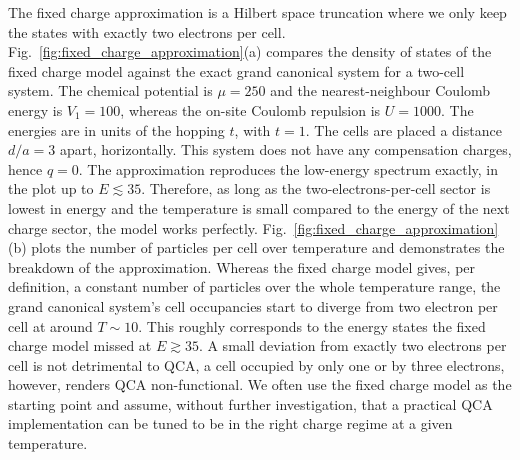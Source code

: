 %
The fixed charge approximation is a Hilbert space truncation where we only keep
the states with exactly two electrons per cell.
Fig.~\ref{fig:fixed_charge_approximation}(a) compares the density of states of
the fixed charge model against the exact grand canonical system for a two-cell
system. The chemical potential is $\mu = 250$ and the nearest-neighbour Coulomb
energy is $V_1 = 100$, whereas the on-site Coulomb repulsion is $U = 1000$. The
energies are in units of the hopping $t$, with $t = 1$. The cells are placed a
distance $d/a = 3$ apart, horizontally. This system does not have any
compensation charges, hence $q = 0$. The approximation reproduces the low-energy
spectrum exactly, in the plot up to $E \lesssim 35$. Therefore, as long as the
two-electrons-per-cell sector is lowest in energy and the temperature is small
compared to the energy of the next charge sector, the model works perfectly.
Fig.~\ref{fig:fixed_charge_approximation}(b) plots the number of particles per
cell over temperature and demonstrates the breakdown of the approximation.
Whereas the fixed charge model gives, per definition, a constant number of
particles over the whole temperature range, the grand canonical system's cell
occupancies start to diverge from two electron per cell at around $T \sim 10$.
This roughly corresponds to the energy states the fixed charge model missed at
$E \gtrsim 35$. A small deviation from exactly two electrons per cell is not
detrimental to QCA, a cell occupied by only one or by three electrons, however,
renders QCA non-functional. We often use the fixed charge model as the starting
point and assume, without further investigation, that a practical QCA
implementation can be tuned to be in the right charge regime at a given
temperature.

